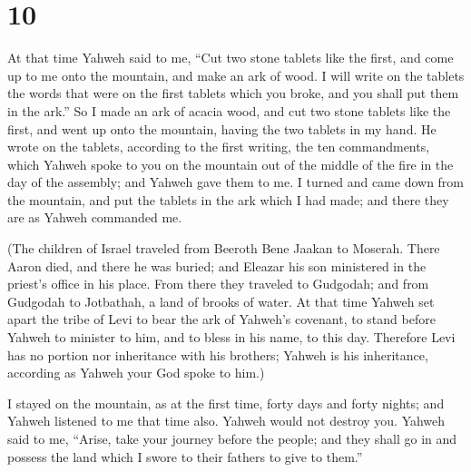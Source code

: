 \hypertarget{section-9}{%
\section{10}\label{section-9}}

 At that time Yahweh said to me, ``Cut two stone tablets
like the first, and come up to me onto the mountain, and make an ark of
wood.  I will write on the tablets the words that were on
the first tablets which you broke, and you shall put them in the ark.''
 So I made an ark of acacia wood, and cut two stone tablets
like the first, and went up onto the mountain, having the two tablets in
my hand.  He wrote on the tablets, according to the first
writing, the ten commandments, which Yahweh spoke to you on the mountain
out of the middle of the fire in the day of the assembly; and Yahweh
gave them to me.  I turned and came down from the mountain,
and put the tablets in the ark which I had made; and there they are as
Yahweh commanded me.

 (The children of Israel traveled from Beeroth Bene Jaakan
to Moserah. There Aaron died, and there he was buried; and Eleazar his
son ministered in the priest's office in his place.  From
there they traveled to Gudgodah; and from Gudgodah to Jotbathah, a land
of brooks of water.  At that time Yahweh set apart the tribe
of Levi to bear the ark of Yahweh's covenant, to stand before Yahweh to
minister to him, and to bless in his name, to this day. 
Therefore Levi has no portion nor inheritance with his brothers; Yahweh
is his inheritance, according as Yahweh your God spoke to him.)

 I stayed on the mountain, as at the first time, forty days
and forty nights; and Yahweh listened to me that time also. Yahweh would
not destroy you.  Yahweh said to me, ``Arise, take your
journey before the people; and they shall go in and possess the land
which I swore to their fathers to give to them.''

